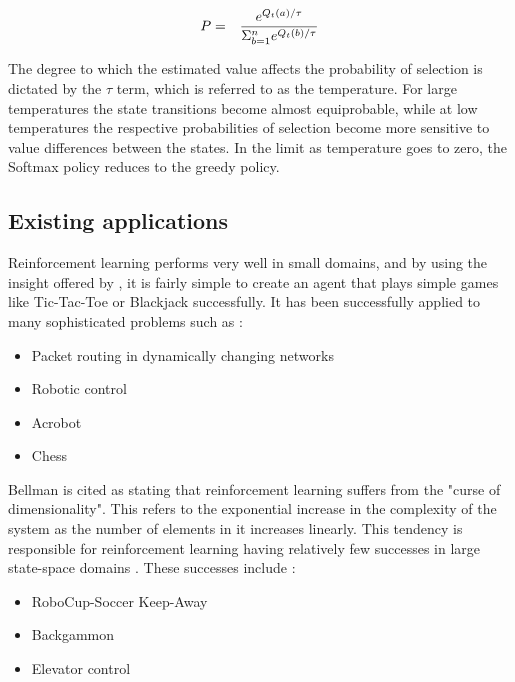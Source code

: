 \documentclass{rucsthesis}
\begin{document}
\begin{eqnarray}
\centering
P & = & \frac{e^{Q_{t}(a)/\tau}}{\Sigma_{b=1}^{n}e^{Q_{t}(b)/\tau}} \label{eq:softmax}
\end{eqnarray}

The degree to which the estimated value affects the probability of selection is dictated by the $\tau$ term, which is referred to as the temperature. For large temperatures the state transitions become almost equiprobable, while at low temperatures the respective probabilities of selection become more sensitive to value differences between the states.  In the limit as temperature goes to zero, the Softmax policy reduces to the greedy policy.


\subsection{Existing applications}

Reinforcement learning performs very well in small domains, and by using the insight offered by \cite{suttonbarto}, it is fairly simple to create an agent that plays simple games like Tic-Tac-Toe or Blackjack successfully. It has been successfully applied to many sophisticated problems such as :

\begin{itemize}
\item{Packet routing in dynamically changing networks \citep{boyan94packet}}
\item{Robotic control \citep{rlrobotics}}
\item{Acrobot \citep{suttonbarto} }
\item{Chess \citep{baxter98knightcap}}
\end{itemize}

Bellman is cited \citep{suttonbarto} as stating that reinforcement learning suffers from the "curse of dimensionality".  This refers to the exponential increase in the complexity of the system as the number of elements in it increases linearly. This tendency is responsible for reinforcement learning having relatively few successes in large state-space domains \citep{keepaway}. These successes include : 

\begin{itemize}
\item{RoboCup-Soccer Keep-Away \citep{keepaway}}
\item{Backgammon \citep{tdgammon}}
\item{Elevator control \citep{elevator}}
\end{itemize}
\end{document}
